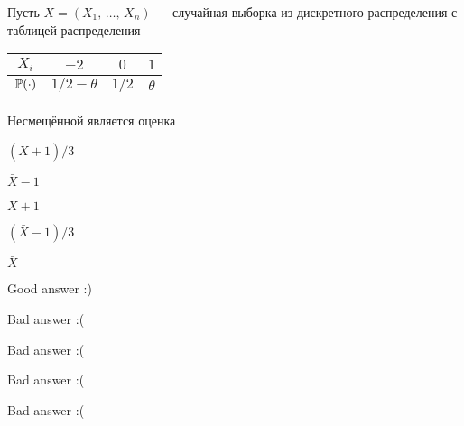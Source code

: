
\begin{question}
Пусть \(X = (X_1, \, \ldots, \, X_n)\) — случайная выборка из
дискретного распределения с таблицей распределения

\vspace{5mm}
\begin{tabular}{cccc}
\toprule
$X_i$  & $-2$    & $0$      & $1$  \\
\midrule
$\P(\cdot)$        & $1/2 - \theta$      & $1/2$    & $\theta$  \\
\bottomrule
\end{tabular}
\vspace{5mm}

Несмещённой является оценка
\begin{answerlist}
  \item \((\bar{X} + 1) / 3\)
  \item \(\bar{X} - 1\)
  \item \(\bar{X} + 1\)
  \item \((\bar{X} - 1) / 3\)
  \item \(\bar{X}\)
\end{answerlist}
\end{question}

\begin{solution}
\begin{answerlist}
  \item Good answer :)
  \item Bad answer :(
  \item Bad answer :(
  \item Bad answer :(
  \item Bad answer :(
\end{answerlist}
\end{solution}

